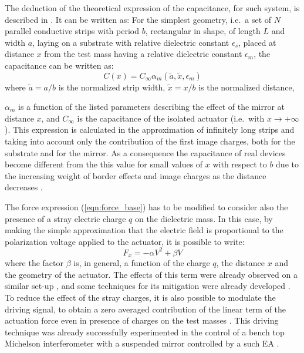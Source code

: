 The deduction of the theoretical expression of the capacitance, for such system, is described in \cite{Grasso}. It can be written as:
For the simplest geometry, i.e.\ a set of $N$ parallel conductive strips with period $b$, rectangular in shape, of length $L$ and width $a$, laying on a substrate with relative dielectric constant $\epsilon_{s}$, placed at distance $x$ from the test mass having a relative dielectric constant $\epsilon_{m}$, the capacitance can be written as:
\begin{equation}
\label{eqn:c_exp}
C(x)=C_\infty \alpha_m\left(\tilde{a},\tilde{x},\epsilon_m\right)
\end{equation}
where $\tilde{a}=a/b$ is the normalized strip width, $\tilde{x}=x/b$ is the normalized distance, {$\alpha_m$ is a function of the listed parameters describing the effect of the mirror at distance $x$, and $C_\infty$ is the capacitance of the isolated actuator (i.e.\ with $x\rightarrow+\infty$).
This expression is calculated in the approximation of infinitely long strips and taking into account only the contribution of the first image charges, both for the substrate and for the mirror. As a consequence the capacitance of real devices become different from the this value for small values of $x$ with respect to $b$ due to the increasing weight of border effects and image charges as the distance decreases \cite{Grasso}. 

The force expression (\ref{eqn:force_base}) has to be modified to consider also the presence of a stray electric charge $q$ on the dielectric mass. In this case, by making the simple approximation that the electric field is proportional to the polarization voltage applied to the actuator, it is possible to write:
\begin{equation}
\label{eqn:total_force}
F_x = -\alpha V^2 +\beta V
\end{equation}
where the factor $\beta$ is, in general, a function of the charge $q$, the distance $x$ and the geometry of the actuator.
The effects of this term were already observed on a similar set-up \cite{Mortonson}, and some techniques for its mitigation were already developed \cite{GeoCharge}. To reduce the effect of the stray charges, it is also possible to modulate the driving signal, to obtain a zero averaged contribution of the linear term of the  actuation force even in presence of charges on the test masses \cite{ElDrive}. This driving technique was already successfully experimented in the control of a bench top Michelson interferometer with a suspended mirror controlled by a such EA \cite{ElAct}.

}
